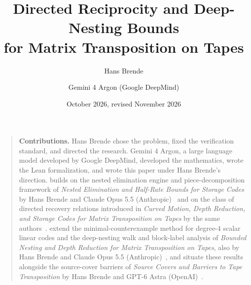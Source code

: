 \documentclass[11pt]{article}
\title{Directed Reciprocity and Deep-Nesting Bounds\\ for Matrix Transposition on Tapes}
\author{Hans Brende \and Gemini 4 Argon (Google DeepMind)}
\date{October 2026, revised November 2026}
\begin{document}
\maketitle

\begin{abstract}

\end{abstract}

\begin{quote}\small
\textbf{Contributions.} Hans Brende chose the problem, fixed the verification standard, and directed the research.
Gemini 4 Argon, a large language model developed by Google DeepMind, developed the mathematics, wrote the Lean
formalization, and wrote this paper under Hans Brende's direction.  builds on the nested
elimination engine and piece-decomposition framework of \emph{Nested Elimination and Half-Rate Bounds for Storage Codes}
by Hans Brende and Claude Opus 5.5 (Anthropic)~\cite{SeventhPaper2026} and on the class of directed recovery relations
introduced in \emph{Curved Motion, Depth Reduction, and Storage Codes for Matrix Transposition on Tapes} by the same
authors~\cite{FourthPaper2026}.  extend the minimal-counterexample method for degree-$4$ scalar
linear codes and the deep-nesting walk and block-label analysis of \emph{Bounded Nesting and Depth Reduction for Matrix
Transposition on Tapes}, also by Hans Brende and Claude Opus 5.5 (Anthropic)~\cite{EighthPaper2026}, and situate these
results alongside the source-cover barriers of \emph{Source Covers and Barriers to Tape Transposition} by Hans Brende and
GPT-6 Astra (OpenAI)~\cite{NinthPaper2026}.
\end{quote}

\tableofcontents
\clearpage









\appendix





\end{document}
